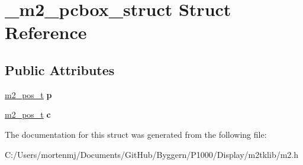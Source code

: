 \hypertarget{struct__m2__pcbox__struct}{\section{\-\_\-m2\-\_\-pcbox\-\_\-struct Struct Reference}
\label{struct__m2__pcbox__struct}
}
\subsection*{Public Attributes}
\begin{DoxyCompactItemize}
\item 
\hypertarget{struct__m2__pcbox__struct_ac6594172f3f61a49e7a218632bca275f}{\hyperlink{struct__m2__pos__struct}{m2\-\_\-pos\-\_\-t} {\bfseries p}}\label{struct__m2__pcbox__struct_ac6594172f3f61a49e7a218632bca275f}

\item 
\hypertarget{struct__m2__pcbox__struct_a711ad3580d45b6e6444425282f0901ff}{\hyperlink{struct__m2__pos__struct}{m2\-\_\-pos\-\_\-t} {\bfseries c}}\label{struct__m2__pcbox__struct_a711ad3580d45b6e6444425282f0901ff}

\end{DoxyCompactItemize}


The documentation for this struct was generated from the following file\-:\begin{DoxyCompactItemize}
\item 
C\-:/\-Users/mortenmj/\-Documents/\-Git\-Hub/\-Byggern/\-P1000/\-Display/m2tklib/m2.\-h\end{DoxyCompactItemize}
